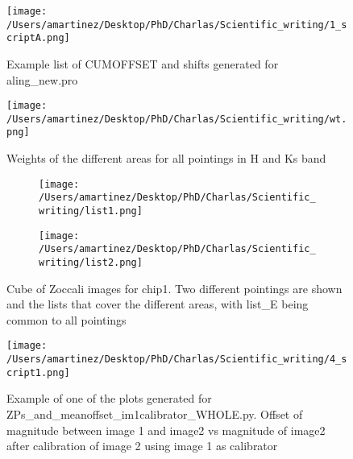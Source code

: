 \documentclass[4paper,11pt]{report}
\begin{document}
\begin{figure}[b]
	\begin{center}
		\texttt{[image: /Users/amartinez/Desktop/PhD/Charlas/Scientific\_writing/1\_scriptA.png]}
		\caption{ Example list of CUMOFFSET and shifts generated for aling\_new.pro}
		\label{fig0:wt}
	\end{center}
	
\end{figure}

\begin{figure}
	\begin{center}
		\texttt{[image: /Users/amartinez/Desktop/PhD/Charlas/Scientific\_writing/wt.png]}
		\caption{Weights of the different areas for all pointings in H and Ks band}
		\label{fig2:wt}
	\end{center}
	
\end{figure}

\begin{figure}
	\begin{subfigure}[b]{0.55\textwidth}
		\texttt{[image: /Users/amartinez/Desktop/PhD/Charlas/Scientific\_writing/list1.png]}
	\end{subfigure}
	\begin{subfigure}[b]{0.55\textwidth}
		\texttt{[image: /Users/amartinez/Desktop/PhD/Charlas/Scientific\_writing/list2.png]}
	\end{subfigure}
    \captionsetup{justification=centering}
	\caption{Cube of Zoccali images for chip1. Two different pointings are shown and the lists that cover the different areas, with list\_E being common to all pointings}
	\label{fig1:lists}
\end{figure}	

\begin{figure}[b]
\begin{center}
	\texttt{[image: /Users/amartinez/Desktop/PhD/Charlas/Scientific\_writing/4\_script1.png]}
	\caption{ Example of one of the plots generated for ZPs\_and\_meanoffset\_im1calibrator\_WHOLE.py. Offset of magnitude between image 1 and image2 vs magnitude of image2 after calibration of image 2 using image 1 as calibrator }
	\label{fig:4_script1}
\end{center}
\end{figure}
\end{document}
